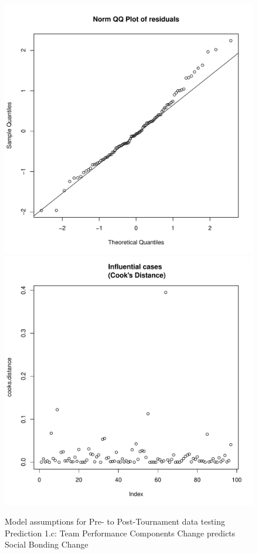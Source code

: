 \begin{CJK}{UTF8}{gbsn}
\begin{figure}[htbp]
        \includegraphics[scale =.4]{images/MLM23aQQNorm.pdf}
        \includegraphics[scale =.4]{images/MLM23aCooksD.pdf}
        \caption{Model assumptions for Pre- to Post-Tournament data testing Prediction 1.c: Team Performance Components Change predicts Social Bonding Change}
        \label{fig:MLM23aAssumptions}
      \end{figure}







\end{CJK}

